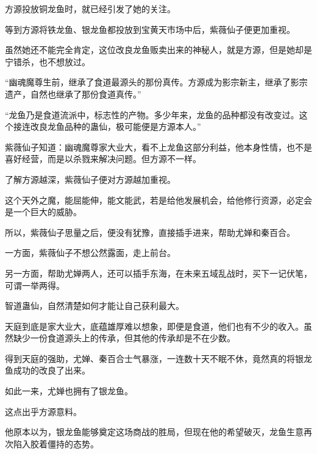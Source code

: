 \begin{this_body}
方源投放铜龙鱼时，就已经引发了她的关注。

等到方源将铁龙鱼、银龙鱼都投放到宝黄天市场中后，紫薇仙子便更加重视。

虽然她还不能完全肯定，这位改良龙鱼贩卖出来的神秘人，就是方源，但是她却是宁错杀，也不想放过。

“幽魂魔尊生前，继承了食道最源头的那份真传。方源成为影宗新主，继承了影宗遗产，自然也继承了那份食道真传。”

“龙鱼乃是食道流派中，标志性的产物。多少年来，龙鱼的品种都没有改变过。这个接连改良龙鱼品种的蛊仙，极可能便是方源本人。”

紫薇仙子知道：幽魂魔尊家大业大，看不上龙鱼这部分利益，他本身性情，也不是喜好经营，而是以杀戮来解决问题。但方源不一样。

了解方源越深，紫薇仙子便对方源越加重视。

这个天外之魔，能屈能伸，能文能武，若是给他发展机会，给他修行资源，必定会是一个巨大的威胁。

所以，紫薇仙子思量之后，便没有犹豫，直接插手进来，帮助尤婵和秦百合。

一方面，紫薇仙子不想公然露面，走上前台。

另一方面，帮助尤婵两人，还可以插手东海，在未来五域乱战时，买下一记伏笔，可谓一举两得。

智道蛊仙，自然清楚如何才能让自己获利最大。

天庭到底是家大业大，底蕴雄厚难以想象，即便是食道，他们也有不少的收入。虽然缺少一份食道源头上的传承，但其他的传承却是不在少数。

得到天庭的强助，尤婵、秦百合士气暴涨，一连数十天不眠不休，竟然真的将银龙鱼成功的改良了出来。

如此一来，尤婵也拥有了银龙鱼。

这点出乎方源意料。

他原本以为，银龙鱼能够奠定这场商战的胜局，但现在他的希望破灭，龙鱼生意再次陷入胶着僵持的态势。

\end{this_body}

